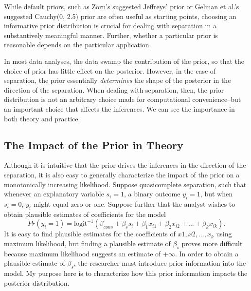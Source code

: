 \documentclass[12pt]{article}
\begin{document}
While default priors, such as Zorn's suggested Jeffreys' prior or Gelman et al.'s suggested Cauchy(0, 2.5) prior are often useful as starting points, choosing an informative prior distribution is crucial for dealing with separation in a substantively meaningful manner. 
Further, whether a particular prior is reasonable depends on the particular application.

In most data analyses, the data swamp the contribution of the prior, so that the choice of prior has little effect on the posterior. 
However, in the case of separation, the prior essentially \emph{determines} the shape of the posterior in the direction of the separation. 
When dealing with separation, then, the prior distribution is not an arbitrary choice made for computational convenience--but an important choice that affects the inferences. 
We can see the importance in both theory and practice.

\subsection*{The Impact of the Prior in Theory}

Although it is intuitive that the prior drives the inferences in the direction of the separation, it is also easy to generally characterize the impact of the prior on a monotonically increasing likelihood. 
Suppose quasicomplete separation, such that whenever an explanatory variable $s_i = 1$, a binary outcome $y_i = 1$, but when $s_i = 0$, $y_i$ might equal zero or one. 
Suppose further that the analyst wishes to obtain plausible estimates of coefficients for the model
\begin{equation}
Pr(y_i =1) = \text{logit}^{-1}(\beta_{cons} + \beta_s s_i +  \beta_1 x_{i1} + \beta_2 x_{i2} + ... + \beta_k x_{ik}). 
\end{equation}
\noindent It is easy to find plausible estimates for the coefficients of $x1, x2, ..., x_k$ using maximum likelihood, but finding a plausible estimate of $\beta_{s}$ proves more difficult because maximum likelihood suggests an estimate of $+\infty$. 
In order to obtain a plausible estimate of $\beta_{s}$, the researcher must introduce prior information into the model. 
My purpose here is to characterize how this prior information impacts the posterior distribution.
\end{document}
